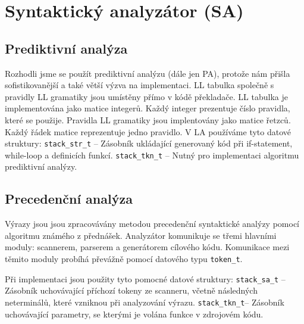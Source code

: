 \documentclass[11pt, a4paper]{article}
\begin{document}
\section{Syntaktický analyzátor (SA)}
\subsection{Prediktivní analýza}
Rozhodli jsme se použít prediktivní analýzu (dále jen PA), protože nám přišla sofistikovanější a také větší výzva na implementaci. LL tabulka společně s pravidly LL gramatiky jsou umístěny přímo v kódě překladače. LL tabulka je implementována jako matice integerů. Každý integer prezentuje číslo pravidla, které se použije. Pravidla LL gramatiky jsou implentovány jako matice řetzců. Každý řádek matice reprezentuje jedno pravidlo. V LA používáme tyto datové struktury:\newline
\verb|stack_str_t| -- Zásobník ukládající generovaný kód při if-statement, while-loop a definicích funkcí.\newline
\verb|stack_tkn_t| -- Nutný pro implementaci algoritmu prediktivní analýzy. \newline

\subsection{Precedenční analýza}
Výrazy jsou jsou zpracovávány metodou precedenční syntaktické analýzy pomocí algoritmu známého z přednášek. Analyzátor komunikuje se třemi hlavními moduly: scannerem, parserem a generátorem cílového kódu. Komunikace mezi těmito moduly probíhá převážně pomocí datového typu \verb|token_t|.

Při implementaci jsou použity tyto pomocné datové struktury:
       \verb|stack_sa_t| -- Zásobník uchovávající příchozí tokeny ze scanneru, včetně následných neterminálů, které vzniknou při analyzování výrazu.
       \verb|stack_tkn_t|-- Zásobník uchovávající parametry, se kterými je volána funkce v zdrojovém kódu.



\iffalse
\begin{comment}
\label{sec:3}
Pokud budeme chtít vysázet algoritmus, můžeme použít prostředí \verb|algorithm|\footnote{Pro nápovědu, jak
zacházet s prostředím \texttt{algorithm}, můžeme zkusit tuhle stránku: \newline
http://ftp.cstug.cz/pub/tex/CTAN/macros/latex/contrib/algorithms/algorithms.pdf.}  nebo
\verb|algorithm2e|\footnote{Pro \texttt{algorithm2e} zase tuhle:
http://ftp.cstug.cz/pub/tex/CTAN/macros/latex/contrib/algorithm2e/algorithm2e.pdf.}. \newline
Příklad použití prostředí \verb|algorithm2e| viz Algoritmus \ref{algoritmus:1}.
\vspace{1.5em}

\end{comment}
\fi
\end{document}
